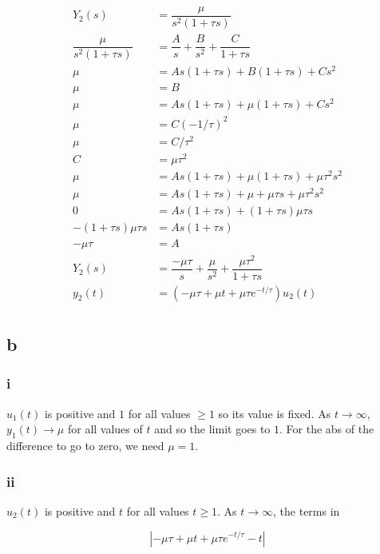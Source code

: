 \documentclass[11pt]{article}
\begin{document}
\begin{align*}
    Y_2(s) &= \dfrac{\mu}{s^2(1 + \tau s)} \\
    \dfrac{\mu}{s^2(1 + \tau s)} &= \dfrac{A}{s} + \dfrac{B}{s^2} + \dfrac{C}{1 + \tau s} \\
    \mu &= A s(1 + \tau s) + B(1 + \tau s) + Cs^2 \\
    \mu &= B \tag{$s = 0$} \\
    \mu &= A s (1 + \tau s) + \mu (1 + \tau s) + Cs^2 \\
    \mu &= C (-1/\tau)^2 \tag{$s = -1/\tau$} \\
    \mu &= C / \tau^2 \\
    C &= \mu \tau^2 \\
    \mu &= As(1 + \tau s) + \mu (1 + \tau s) + \mu \tau^2 s^2 \\
    \mu &= As(1 + \tau s) + \mu + \mu \tau s + \mu \tau^2 s^2 \\
    0 &= As (1 + \tau s) + (1 + \tau s) \mu \tau s \\
    - (1 + \tau s) \mu \tau s &= As (1 + \tau s) \\
    - \mu \tau &= A \\
    Y_2(s) &= \dfrac{-\mu \tau}{s} + \dfrac{\mu}{s^2} + \dfrac{\mu \tau^2}{1 + \tau s} \\
    y_2(t) &= (-\mu \tau + \mu t + \mu \tau e^{-t / \tau}) u_2(t) \\ 
\end{align*}

\subsection{b}

\subsubsection{i}

$u_1(t)$ is positive and $1$ for all values $\geq 1$ so its value is fixed. As $t \to \infty$, $y_1(t) \to \mu$ for all values of $t$ and so the limit goes to $1$. For the abs of the difference to go to zero, we need $\mu = 1$.

\subsubsection{ii}

$u_2(t)$ is positive and $t$ for all values $t \geq 1$. As $t \to \infty$, the terms in

\[ | -\mu\tau + \mu t + \mu \tau e^{-t/\tau} - t | \]
\end{document}
